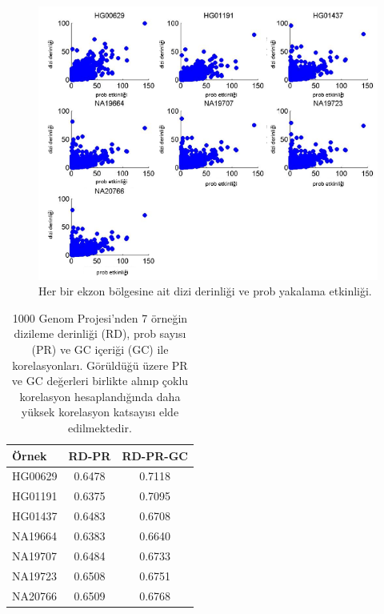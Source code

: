 \documentclass[11pt]{article}
\begin{document}
\begin{figure}[htb]
\begin{center}
  \includegraphics[scale=0.65]{captureeff.png}
\end{center}
\caption{Her bir ekzon bölgesine ait dizi derinliği ve prob yakalama etkinliği.}
\label{fig:captureeff}
\end{figure}

\begin{table}[htb]
\begin{center}
\begin{tabular}{|l|c|c|}
\hline 
{\bf Örnek } & {\bf RD-PR} & {\bf RD-PR-GC}\\
\hline 
HG00629 & 0.6478 & 0.7118\\
HG01191 & 0.6375 & 0.7095\\
HG01437 & 0.6483 & 0.6708\\
NA19664 & 0.6383 & 0.6640\\
NA19707 & 0.6484 & 0.6733\\
NA19723 & 0.6508 & 0.6751\\
NA20766 & 0.6509 & 0.6768\\
\hline
\end{tabular}
\end{center}
\caption{1000 Genom Projesi'nden 7 örneğin dizileme derinliği (RD), prob sayısı (PR) ve GC içeriği (GC) ile korelasyonları. Görüldüğü üzere PR ve GC değerleri birlikte alınıp çoklu korelasyon hesaplandığında daha yüksek korelasyon katsayısı elde edilmektedir.}
\label{tab:correlation}
\end{table}
\end{document}
